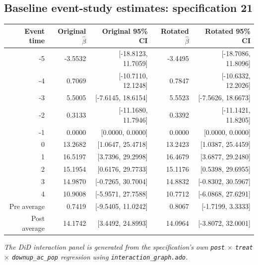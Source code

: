 \documentclass[10pt]{article}
\begin{document}
\subsection*{Baseline event-study estimates: specification 21}
\begin{center}
\scriptsize
\begin{tabular}{r rr rr}
\toprule
Event time & Original $\hat\beta$ & Original 95\% CI & Rotated $\hat\beta$ & Rotated 95\% CI \\
\midrule
-5 & -3.5532 & [-18.8123, 11.7059] & -3.4495 & [-18.7086, 11.8096] \\
-4 & 0.7069 & [-10.7110, 12.1248] & 0.7847 & [-10.6332, 12.2026] \\
-3 & 5.5005 & [-7.6145, 18.6154] & 5.5523 & [-7.5626, 18.6673] \\
-2 & 0.3133 & [-11.1680, 11.7946] & 0.3392 & [-11.1421, 11.8205] \\
-1 & 0.0000 & [0.0000, 0.0000] & 0.0000 & [0.0000, 0.0000] \\
0 & 13.2682 & [1.0647, 25.4718] & 13.2423 & [1.0387, 25.4459] \\
1 & 16.5197 & [3.7396, 29.2998] & 16.4679 & [3.6877, 29.2480] \\
2 & 15.1954 & [0.6176, 29.7733] & 15.1176 & [0.5398, 29.6955] \\
3 & 14.9870 & [-0.7265, 30.7004] & 14.8832 & [-0.8302, 30.5967] \\
4 & 10.9008 & [-5.9571, 27.7588] & 10.7712 & [-6.0868, 27.6291] \\
\midrule
Pre average & 0.7419 & [-9.5405, 11.0242] & 0.8067 & [-1.7199, 3.3333] \\
Post average & 14.1742 & [3.4492, 24.8993] & 14.0964 & [-3.8072, 32.0001] \\
\bottomrule
\end{tabular}
\end{center}
\medskip
\textit{The DiD interaction panel is generated from the specification's own \texttt{post} $\times$ \texttt{treat} $\times$ \texttt{downup\_ac\_pop} regression using \texttt{interaction\_graph.ado}.}
\clearpage
\end{document}
